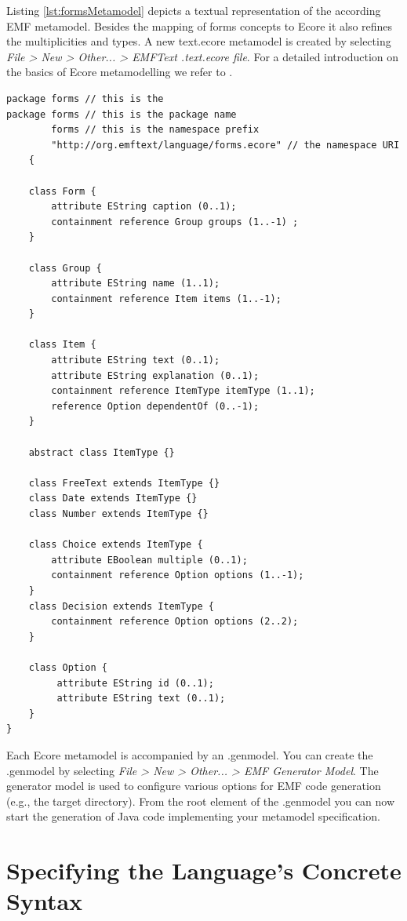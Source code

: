 	Listing \ref{lst:formsMetamodel} depicts a textual representation of the
	according EMF metamodel. Besides the mapping of forms concepts to Ecore it
	also refines the multiplicities and types. A new text.ecore metamodel is
	created by selecting \emph{File > New > Other... > EMFText .text.ecore
	file}. For a detailed introduction on the basics of Ecore metamodelling we
	refer to .

	

	\begin{lstlisting}[label=lst:formsMetamodel, caption=Metamodel for the
	exemplary forms language written in text.ecore] package forms // this is the
package forms // this is the package name 
        forms // this is the namespace prefix
        "http://org.emftext/language/forms.ecore" // the namespace URI 
	{

	class Form {
		attribute EString caption (0..1);
		containment reference Group groups (1..-1) ;
	}
	
	class Group {
		attribute EString name (1..1);
		containment reference Item items (1..-1);
	}

	class Item {
		attribute EString text (0..1);
		attribute EString explanation (0..1);
	    containment reference ItemType itemType (1..1);
		reference Option dependentOf (0..-1);
	}

	abstract class ItemType {}

	class FreeText extends ItemType {}
	class Date extends ItemType {}	
	class Number extends ItemType {}

	class Choice extends ItemType {
		attribute EBoolean multiple (0..1);
		containment reference Option options (1..-1);
	}
	class Decision extends ItemType {
		containment reference Option options (2..2);
	}
		
	class Option {
		 attribute EString id (0..1);
		 attribute EString text (0..1);
	}
}

	\end{lstlisting}
	
Each Ecore metamodel is accompanied by an .genmodel. You can create the
	.genmodel by selecting \emph{File > New > Other... > EMF Generator Model}.
	The generator model is used to configure various options for EMF code
	generation (e.g., the target directory). From the root element of the .genmodel
	you can now start the generation of Java code implementing your metamodel
	specification.

\section{Specifying the Language's Concrete Syntax}
\label{sec:process_specification}

